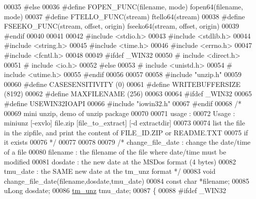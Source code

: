 \begin{DoxyCode}
00035 \textcolor{preprocessor}{#else}
00036 \textcolor{preprocessor}{#define FOPEN\_FUNC(filename, mode) fopen64(filename, mode)}
00037 \textcolor{preprocessor}{#define FTELLO\_FUNC(stream) ftello64(stream)}
00038 \textcolor{preprocessor}{#define FSEEKO\_FUNC(stream, offset, origin) fseeko64(stream, offset, origin)}
00039 \textcolor{preprocessor}{#endif}
00040 
00041 
00042 \textcolor{preprocessor}{#include <stdio.h>}
00043 \textcolor{preprocessor}{#include <stdlib.h>}
00044 \textcolor{preprocessor}{#include <string.h>}
00045 \textcolor{preprocessor}{#include <time.h>}
00046 \textcolor{preprocessor}{#include <errno.h>}
00047 \textcolor{preprocessor}{#include <fcntl.h>}
00048 
00049 \textcolor{preprocessor}{#ifdef \_WIN32}
00050 \textcolor{preprocessor}{# include <direct.h>}
00051 \textcolor{preprocessor}{# include <io.h>}
00052 \textcolor{preprocessor}{#else}
00053 \textcolor{preprocessor}{# include <unistd.h>}
00054 \textcolor{preprocessor}{# include <utime.h>}
00055 \textcolor{preprocessor}{#endif}
00056 
00057 
00058 \textcolor{preprocessor}{#include "unzip.h"}
00059 
00060 \textcolor{preprocessor}{#define CASESENSITIVITY (0)}
00061 \textcolor{preprocessor}{#define WRITEBUFFERSIZE (8192)}
00062 \textcolor{preprocessor}{#define MAXFILENAME (256)}
00063 
00064 \textcolor{preprocessor}{#ifdef \_WIN32}
00065 \textcolor{preprocessor}{#define USEWIN32IOAPI}
00066 \textcolor{preprocessor}{#include "iowin32.h"}
00067 \textcolor{preprocessor}{#endif}
00068 \textcolor{comment}{/*}
00069 \textcolor{comment}{  mini unzip, demo of unzip package}
00070 \textcolor{comment}{}
00071 \textcolor{comment}{  usage :}
00072 \textcolor{comment}{  Usage : miniunz [-exvlo] file.zip [file\_to\_extract] [-d extractdir]}
00073 \textcolor{comment}{}
00074 \textcolor{comment}{  list the file in the zipfile, and print the content of FILE\_ID.ZIP or README.TXT}
00075 \textcolor{comment}{    if it exists}
00076 \textcolor{comment}{*/}
00077 
00078 
00079 \textcolor{comment}{/* change\_file\_date : change the date/time of a file}
00080 \textcolor{comment}{    filename : the filename of the file where date/time must be modified}
00081 \textcolor{comment}{    dosdate : the new date at the MSDos format (4 bytes)}
00082 \textcolor{comment}{    tmu\_date : the SAME new date at the tm\_unz format */}
00083 \textcolor{keywordtype}{void} change\_file\_date(filename,dosdate,tmu\_date)
00084     \textcolor{keyword}{const} \textcolor{keywordtype}{char} *filename;
00085     uLong dosdate;
00086     \hyperlink{structtm__unz__s}{tm\_unz} tmu\_date;
00087 \{
00088 \textcolor{preprocessor}{#ifdef \_WIN32}

\end{DoxyCode}
